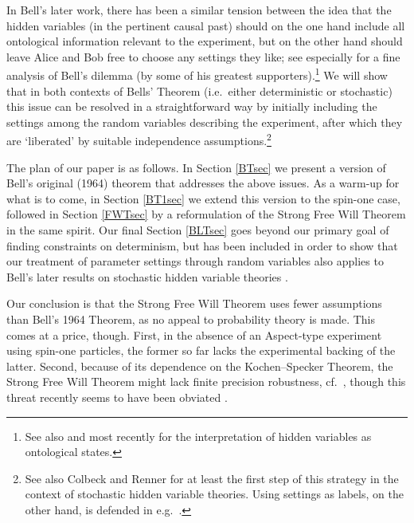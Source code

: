 \documentclass[11pt]{article}
\begin{document}
 In  Bell's later work, there has  been a similar tension between the idea that the hidden variables (in the pertinent causal past) should on the one hand include all ontological information relevant to the experiment, but on the other hand should leave Alice and Bob free to choose any settings they like; see especially \cite{Norsen1,SU} for a fine analysis of Bell's  dilemma (by some of his greatest supporters).\footnote{See also \cite{Bell4,JB} and most recently \cite{Leifer} for the interpretation of hidden variables as ontological states.}
 We will show that in both contexts of Bells' Theorem (i.e.\ either deterministic or stochastic) this issue can be resolved in a straightforward way  by initially including the settings among the random variables describing the experiment, after which they are `liberated'  by suitable independence assumptions.\footnote{See also Colbeck and Renner \cite{CR1} for at least the first step of this strategy in the context of stochastic hidden variable theories. Using settings as labels, on the other hand, is defended in e.g.\ \cite{Bub,JB,SU}.}
  
The plan of our paper is as follows. In  Section \ref{BTsec} we present a version of Bell's original (1964) theorem \cite{Bell1} that addresses the above issues. As a warm-up for what is to come, in Section  \ref{BT1sec} we extend this version to the spin-one case, followed  in Section \ref{FWTsec} by a reformulation of the Strong Free Will Theorem \cite{CK2} in the same spirit. Our final Section \ref{BLTsec} goes beyond our primary goal of finding constraints on determinism, but has been included in order to show that our treatment of parameter settings through random variables also applies to Bell's later results on stochastic hidden variable theories \cite{Bell4,Bub,JB,Gill,Jaeger,Maudlin,Seevinck,Wiseman}.

Our conclusion is  that the Strong Free Will Theorem uses fewer assumptions than Bell's 1964 Theorem, as no appeal to probability theory is made.  This comes at a price, though. First, in the absence of an Aspect-type experiment using spin-one particles, the former so far lacks the experimental backing of the latter. Second, because of its dependence  on the Kochen--Specker Theorem, the Strong Free Will Theorem might lack finite precision robustness, cf.\  \cite{Appleby,BK,Hermens}, though this threat recently seems to have been obviated \cite{Hermens2}.
\end{document}
